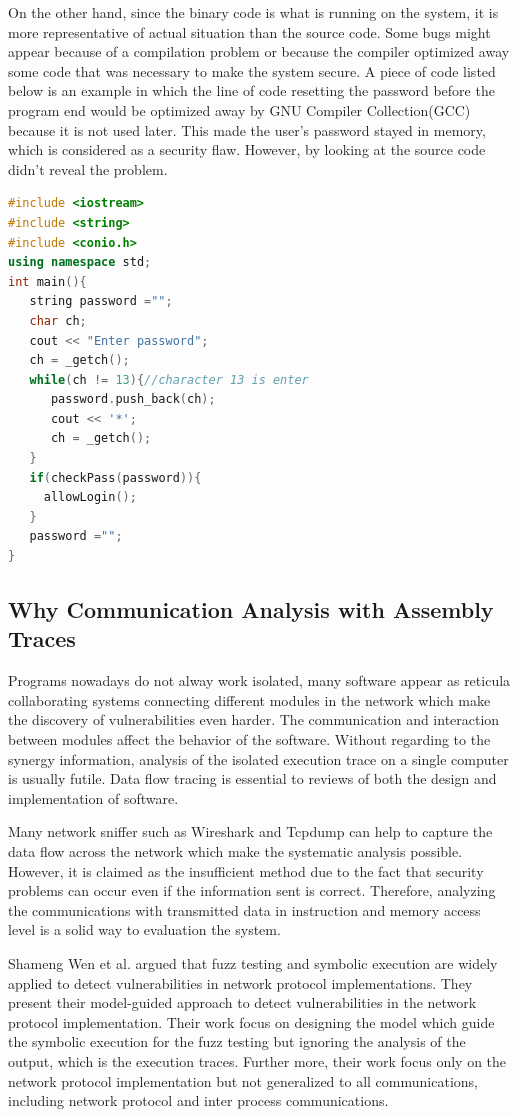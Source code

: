 On the other hand, since the binary code is what is running on the system, it is more representative of actual situation than the source code.  Some bugs might appear because of a compilation problem or because the compiler optimized away some code that was
necessary to make the system secure. A piece of code listed below is an example in which the line of code resetting the password before the program end would be optimized away by GNU Compiler Collection(GCC) because it is not used later. This made the user's password stayed in memory, which is considered as a security flaw. However, by looking at the source code didn't reveal the problem.

\begin{lstlisting}[language=C++, caption= Password Fetching Example ]
#include <iostream>
#include <string>
#include <conio.h>
using namespace std;
int main(){
   string password ="";
   char ch;
   cout << "Enter password";
   ch = _getch();
   while(ch != 13){//character 13 is enter
      password.push_back(ch);
      cout << '*';
      ch = _getch();
   }   
   if(checkPass(password)){
     allowLogin();
   }  
   password ="";
}
\end{lstlisting}

\subsection{Why Communication Analysis with Assembly Traces}
Programs nowadays do not alway work isolated,  many software  appear as  reticula collaborating systems connecting different modules in the network\cite{PhysRevE.68.046116} which make the discovery of vulnerabilities even harder. The communication and interaction between modules affect the behavior of the software. Without regarding to the synergy information, analysis of the isolated execution trace on a single computer is usually futile. Data flow tracing is essential to reviews of both the design and implementation of software.

Many network sniffer such as Wireshark\cite{_wireshark_????} and Tcpdump\cite{tcpdump_tcpdump/libpcap_????} can help to capture the data flow across the network which make the systematic analysis possible. However, it is claimed as the insufficient method due to the fact that security problems can occur even if the information sent is correct. Therefore, analyzing the communications with transmitted data in instruction and memory access level is a solid way to evaluation the system.

Shameng Wen et al. argued that fuzz testing and symbolic execution are widely applied to detect vulnerabilities in network protocol implementations. They present their model-guided approach to detect vulnerabilities in the network protocol implementation. Their work focus on designing the model which guide the symbolic execution for the fuzz testing \cite{wen2017model} but ignoring the analysis of the output, which is the execution traces. Further more, their work focus only on the network protocol implementation but not generalized to all communications, including network protocol and inter process communications.

